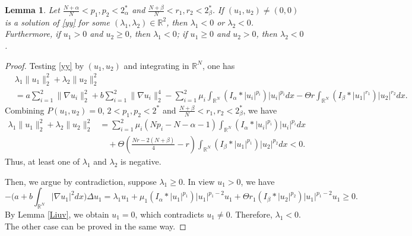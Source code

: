 \documentclass[10pt,a4paper]{amsart}
\numberwithin{equation}{section}
\newtheorem{lemma}[theo]{Lemma}
\begin{document}
\begin{lemma}\label{zjngz}
Let $\frac{N+\alpha}{N}<p_1,p_2<2_\alpha^*$ and $\frac{N+\beta}{N}<r_1,r_2<2_\beta^*$. 
If $(u_1,u_2)\neq(0,0)$ is a solution of
 \eqref{yy} for some $(\lambda_1,\lambda_2)\in\mathbb{R}^2$, then $\lambda_1<0$ 
 or $\lambda_2<0$. Furthermore, if $u_1>0$ and $u_2\geq0$, then
$\lambda_1<0$; if $u_1\geq0$ and $u_2>0$, then $\lambda_2<0$.
\end{lemma}

\begin{proof}
Testing \eqref{yy} by $(u_1,u_2)$ and integrating in $\mathbb{R}^N$, one has
\begin{align*}
&\lambda_1\| u_1\|_2^2+\lambda_2\| u_2\|_2^2 \\
&=a\sum_{i=1}^2\| \nabla u_i\|_2^2+
b\sum_{i=1}^2\| \nabla u_i\|_2^4-\sum_{i=1}^2\mu_i\int_{\mathbb{R}^N}(I_\alpha\ast|u_i|^{p_i})|u_i|^{p_i}dx-
\Theta r\int_{\mathbb{R}^N}(I_\beta\ast|u_1|^{r_1})|u_2|^{r_2}dx.
\end{align*}
Combining $P(u_1,u_2)=0$, $2<p_1,p_2<2^*$ and $\frac{N+\beta}{N}<r_1,r_2<2_\beta^*$,
we have
 \begin{align*}
 \lambda_1\| u_1\|_2^2+\lambda_2\| u_2\|_2^2
&= \sum_{i=1}^2\mu_i(Np_i-N-\alpha-1)
 \int_{\mathbb{R}^N}(I_\alpha\ast|u_i|^{p_i})|u_i|^{p_i}dx\\
&\quad +\Theta\left(\frac{Nr-2(N+\beta)}{4}-r\right)\int_{\mathbb{R}^N}(I_\beta\ast|u_1|^{p_1})|u_2|^{p_2}dx<0.
 \end{align*}
Thus, at least one of $\lambda_1$ and $\lambda_2$ is negative.

Then, we argue by contradiction, suppose $\lambda_1\geq0$. 
In view $u_1>0$, we have
\[
-\Big(a+b\int_{\mathbb{R}^N}|\nabla u_1|^2dx\Big)\Delta u_1
=\lambda_1u_1+\mu_1(I_\alpha\ast|u_1|^{p_1})|u_1|^{p_1-2}u_1
 +\Theta r_1(I_\beta\ast|u_2|^{p_2})|u_1|^{p_1-2}u_1\geq0.
\]
By Lemma \ref{Liuv}, we obtain $u_1=0$, which  contradicts $u_1\neq0$.
Therefore, $\lambda_1<0$. The other case can be proved
in the same way.
\end{proof}
\end{document}
